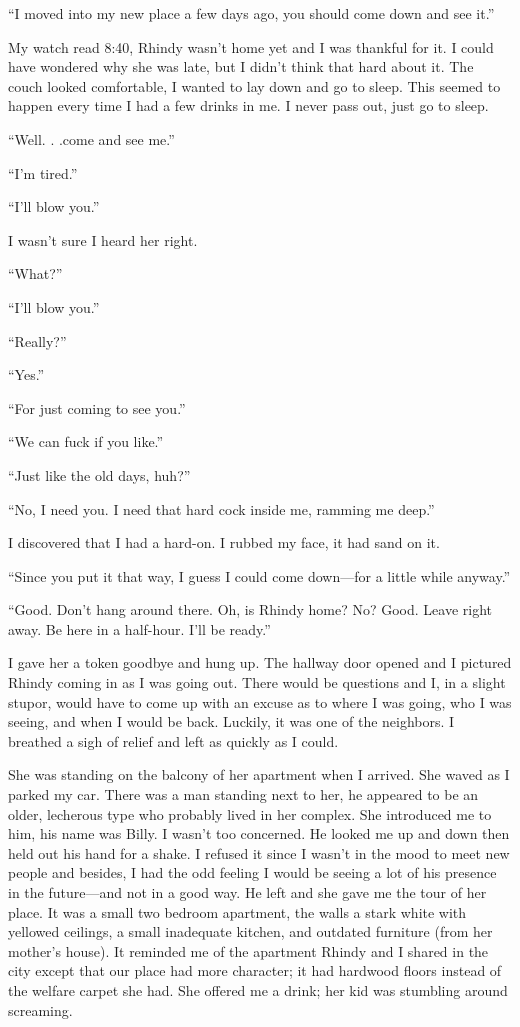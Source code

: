 ``I moved into my new place a few days ago, you should come down and see
it.''

My watch read 8:40, Rhindy wasn't home yet and I was thankful for it. I
could have wondered why she was late, but I didn't think that hard about
it. The couch looked comfortable, I wanted to lay down and go to sleep.
This seemed to happen every time I had a few drinks in me. I never pass
out, just go to sleep.

``Well. . .come and see me.''

``I'm tired.''

``I'll blow you.''

I wasn't sure I heard her right.

``What?''

``I'll blow you.''

``Really?''

``Yes.''

``For just coming to see you.''

``We can fuck if you like.''

``Just like the old days, huh?''

``No, I need you. I need that hard cock inside me, ramming me deep.''

I discovered that I had a hard-on. I rubbed my face, it had sand on it.

``Since you put it that way, I guess I could come down---for a little
while anyway.''

``Good. Don't hang around there. Oh, is Rhindy home? No? Good. Leave
right away. Be here in a half-hour. I'll be ready.''

I gave her a token goodbye and hung up. The hallway door opened and I
pictured Rhindy coming in as I was going out. There would be questions
and I, in a slight stupor, would have to come up with an excuse as to
where I was going, who I was seeing, and when I would be back. Luckily,
it was one of the neighbors. I breathed a sigh of relief and left as
quickly as I could.

She was standing on the balcony of her apartment when I arrived. She
waved as I parked my car. There was a man standing next to her, he
appeared to be an older, lecherous type who probably lived in her
complex. She introduced me to him, his name was Billy. I wasn't too
concerned. He looked me up and down then held out his hand for a shake.
I refused it since I wasn't in the mood to meet new people and besides,
I had the odd feeling I would be seeing a lot of his presence in the
future---and not in a good way. He left and she gave me the tour of her
place. It was a small two bedroom apartment, the walls a stark white
with yellowed ceilings, a small inadequate kitchen, and outdated
furniture (from her mother's house). It reminded me of the apartment
Rhindy and I shared in the city except that our place had more
character; it had hardwood floors instead of the welfare carpet she had.
She offered me a drink; her kid was stumbling around screaming.

